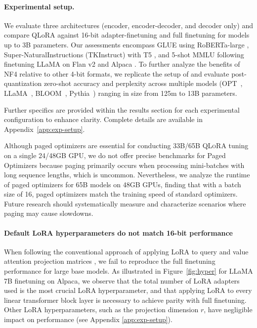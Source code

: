 \paragraph{Experimental setup.} We evaluate three architectures (encoder, encoder-decoder, and decoder only) and compare QLoRA against 16-bit adapter-finetuning and full finetuning for models up to 3B parameters. Our assessments encompass GLUE \citep{wang2018glue} using RoBERTa-large \citep{liu2019roberta}, Super-NaturalInstructions (TKInstruct) \citep{wang2022super} with T5 \citep{t5}, and 5-shot MMLU \citep{hendrycksmeasuring} following finetuning LLaMA on Flan v2 \citep{longpre2023flan} and Alpaca \citep{alpaca}. To further analyze the benefits of NF4 relative to other 4-bit formats, we replicate the setup of \citet{dettmers2022case} and evaluate post-quantization zero-shot accuracy and perplexity across multiple models (OPT~\citep{zhang2022opt}, LLaMA~\citep{touvron2023llama}, BLOOM~\citep{scao2022bloom}, Pythia~\citep{biderman2023pythia}) ranging in size from 125m to 13B parameters.

Further specifics are provided within the results section for each experimental configuration to enhance clarity. Complete details are available in Appendix~\ref{app:exp-setup}.

Although paged optimizers are essential for conducting 33B/65B \textsc{QLoRA} tuning on a single 24/48GB GPU, we do not offer precise benchmarks for Paged Optimizers because paging primarily occurs when processing mini-batches with long sequence lengths, which is uncommon. Nevertheless, we analyze the runtime of paged optimizers for 65B models on 48GB GPUs, finding that with a batch size of 16, paged optimizers match the training speed of standard optimizers. Future research should systematically measure and characterize scenarios where paging may cause slowdowns.

\paragraph{Default LoRA hyperparameters do not match 16-bit performance}

When following the conventional approach of applying LoRA to query and value attention projection matrices \citep{hu2021lora}, we fail to reproduce the full finetuning performance for large base models. As illustrated in Figure~\ref{fig:hyper} for LLaMA 7B finetuning on Alpaca, we observe that the total number of LoRA adapters used is the most crucial LoRA hyperparameter, and that applying LoRA to every linear transformer block layer is necessary to achieve parity with full finetuning. Other LoRA hyperparameters, such as the projection dimension $r$, have negligible impact on performance (see Appendix \ref{app:exp-setup}).

